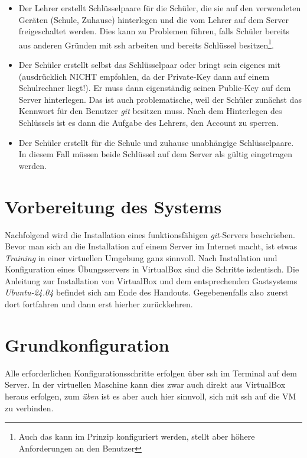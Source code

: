 \documentclass[
  letterpaper,
  DIV=11]{scrreprt}
\newcommand{\git}{\textit{git}\xspace}
\newcommand{\gitservers}{\textit{git}-Servers\xspace}
\begin{document}
\begin{itemize}
\item
  Der Lehrer erstellt Schlüsselpaare für die Schüler, die sie auf den
  verwendeten Geräten (Schule, Zuhause) hinterlegen und die vom Lehrer
  auf dem Server freigeschaltet werden. Dies kann zu Problemen führen,
  falls Schüler bereits aus anderen Gründen mit ssh arbeiten und bereits
  Schlüssel besitzen\footnote{Auch das kann im Prinzip konfiguriert
    werden, stellt aber höhere Anforderungen an den Benutzer}.
\item
  Der Schüler erstellt selbst das Schlüsselpaar oder bringt sein eigenes
  mit (ausdrücklich NICHT empfohlen, da der Private-Key dann auf einem
  Schulrechner liegt!). Er muss dann eigenständig seinen Public-Key auf
  dem Server hinterlegen. Das ist auch problematische, weil der Schüler
  zunächst das Kennwort für den Benutzer \git besitzen muss. Nach dem
  Hinterlegen des Schlüssels ist es dann die Aufgabe des Lehrers, den
  Account zu sperren.
\item
  Der Schüler erstellt für die Schule und zuhause unabhängige
  Schlüsselpaare. In diesem Fall müssen beide Schlüssel auf dem Server
  als gültig eingetragen werden.
\end{itemize}

\section{Vorbereitung des Systems}\label{vorbereitung-des-systems}

Nachfolgend wird die Installation eines funktionsfähigen \gitservers
beschrieben. Bevor man sich an die Installation auf einem Server im
Internet macht, ist etwas \emph{Training} in einer virtuellen Umgebung
ganz sinnvoll. Nach Installation und Konfiguration eines Übungsservers
in VirtualBox sind die Schritte isdentisch. Die Anleitung zur
Installation von VirtualBox und dem entsprechenden Gastsystems
\emph{Ubuntu-24.04} befindet sich am Ende des Handouts. Gegebenenfalls
also zuerst dort fortfahren und dann erst hierher zurückkehren.

\section{Grundkonfiguration}\label{grundkonfiguration}

Alle erforderlichen Konfigurationsschritte erfolgen über ssh im Terminal
auf dem Server. In der virtuellen Maschine kann dies zwar auch direkt
aus VirtualBox heraus erfolgen, zum \emph{üben} ist es aber auch hier
sinnvoll, sich mit ssh auf die VM zu verbinden.
\end{document}
